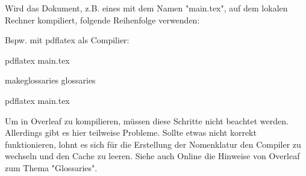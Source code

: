 Wird das Dokument, z.B. eines mit dem Namen "main.tex", auf dem lokalen Rechner kompiliert, folgende Reihenfolge  verwenden:

Bspw. mit pdflatex als Compilier:

pdflatex main.tex

makeglossaries glossaries

pdflatex main.tex

Um in Overleaf zu kompilieren, müssen diese Schritte nicht beachtet werden. Allerdings gibt es hier teilweise Probleme. Sollte etwas nicht korrekt funktionieren, lohnt es sich für die Erstellung der Nomenklatur den Compiler zu wechseln und den Cache zu leeren. Siehe auch Online die Hinweise von Overleaf zum Thema "Glossaries".